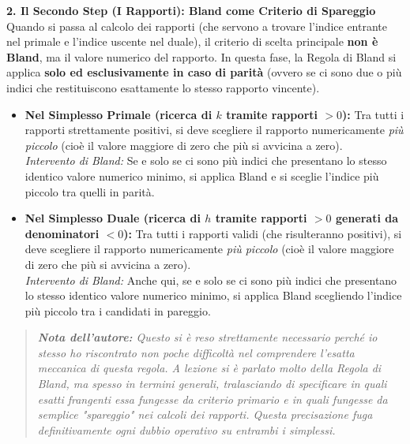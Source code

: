\documentclass[12pt, a4paper]{article}
\begin{document}
	\vspace{0.3cm}
	\textbf{2. Il Secondo Step (I Rapporti): Bland come Criterio di Spareggio}\\
	Quando si passa al calcolo dei rapporti (che servono a trovare l'indice entrante nel primale e l'indice uscente nel duale), il criterio di scelta principale \textbf{non è Bland}, ma il valore numerico del rapporto. In questa fase, la Regola di Bland si applica \textbf{solo ed esclusivamente in caso di parità} (ovvero se ci sono due o più indici che restituiscono esattamente lo stesso rapporto vincente).
	
	\begin{itemize}[label=\textcolor{titlecolor}{\Large\textbullet}, itemsep=4pt, leftmargin=1.5cm]
		\item \textbf{Nel Simplesso Primale (ricerca di $k$ tramite rapporti $> 0$):} 
		Tra tutti i rapporti strettamente positivi, si deve scegliere il rapporto numericamente \textit{più piccolo} (cioè il valore maggiore di zero che più si avvicina a zero). \\
		\textit{Intervento di Bland:} Se e solo se ci sono più indici che presentano lo stesso identico valore numerico minimo, si applica Bland e si sceglie l'indice più piccolo tra quelli in parità.
		
		\item \textbf{Nel Simplesso Duale (ricerca di $h$ tramite rapporti $> 0$ generati da denominatori $< 0$):} Tra tutti i rapporti validi (che risulteranno positivi), si deve scegliere il rapporto numericamente \textit{più piccolo} (cioè il valore maggiore di zero che più si avvicina a zero). \\
		\textit{Intervento di Bland:} Anche qui, se e solo se ci sono più indici che presentano lo stesso identico valore numerico minimo, si applica Bland scegliendo l'indice più piccolo tra i candidati in pareggio.
	\end{itemize}
	
	\vspace{0.1cm}
	\begin{quote}
		\textit{\textbf{Nota dell'autore:} Questo si è reso strettamente necessario perché io stesso ho riscontrato non poche difficoltà nel comprendere l'esatta meccanica di questa regola. A lezione si è parlato molto della Regola di Bland, ma spesso in termini generali, tralasciando di specificare in quali esatti frangenti essa fungesse da criterio primario e in quali fungesse da semplice "spareggio" nei calcoli dei rapporti. Questa precisazione fuga definitivamente ogni dubbio operativo su entrambi i simplessi.}
	\end{quote}
	
\end{document}
